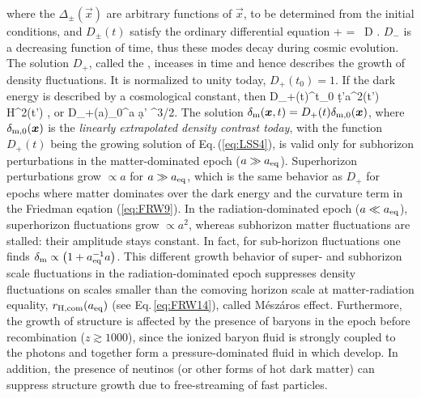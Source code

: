 {where the $\Delta_\pm(\vec x)$ are arbitrary functions of $\vec x$, to be
determined from the initial conditions, and 
$D_\pm(t)$ satisfy the ordinary differential equation
%
\be
{} +   = \, D \;.
\label{eq:LSS4}
\ee
%
$D_-$ is a decreasing function of time, thus these modes decay during
cosmic evolution. The solution $D_+$, called the , 
inceases in time and hence 
describes the growth of density fluctuations. It is normalized to
unity today, $D_+(t_0)=1$. If the dark energy is described by a
cosmological constant, then
%
\be
D_+(t)\int^t_0 {\d t'\over a^2(t') H^2(t')} \;,\quad
\hbox{or}\quad
D_+(a)\int_0^a {\d a' \over {}^{3/2}}\;.
\label{eq:LSS5}
\ee
%
The solution $\delta_{\rm m}(\vec x,t)=D_+(t)\delta_{\rm m,0}(\vec
x)$, where $\delta_{\rm m,0}(\vec x)$ is the {\it linearly
  extrapolated density contrast today}, with the function $D_+(t)$
being the growing solution of Eq.\,(\ref{eq:LSS4}), is valid only for
subhorizon perturbations in
the matter-dominated epoch ($a\gg a_{\rm eq}$). Superhorizon
perturbations grow $\propto a$ for $a\gg a_{\rm eq}$, which is the same
behavior as $D_+$ for epochs where matter dominates over the dark
energy and the curvature term in the Friedman eqation (\ref{eq:FRW9}).
In the radiation-dominated epoch ($a\ll a_{\rm eq}$), superhorizon
fluctuations grow $\propto a^2$, whereas subhorizon matter
fluctuations are stalled: their amplitude stays constant. In fact, for
sub-horizon fluctuations one finds $\delta_{\rm m}\propto
\rund{1+a_{\rm eq}^{-1}a}$. This different growth behavior of super-
and subhorizon scale fluctuations in the radiation-dominated epoch
suppresses density fluctuations on scales smaller than  the comoving
horizon scale at matter-radiation 
equality, $r_{\rm H,com}(a_{\rm eq})$ (see Eq.\,\ref{eq:FRW14}), called
M\'esz\'aros effect. Furthermore, the
growth of structure is affected by the presence of baryons in the epoch
before recombination ($z\gtrsim 1000$), since the ionized baryon fluid
is strongly coupled to the photons and together form a
pressure-dominated fluid in which  develop. In
addition, the presence of neutinos (or other forms of hot dark matter) can suppress structure growth due to
free-streaming of fast particles.
\\
}
